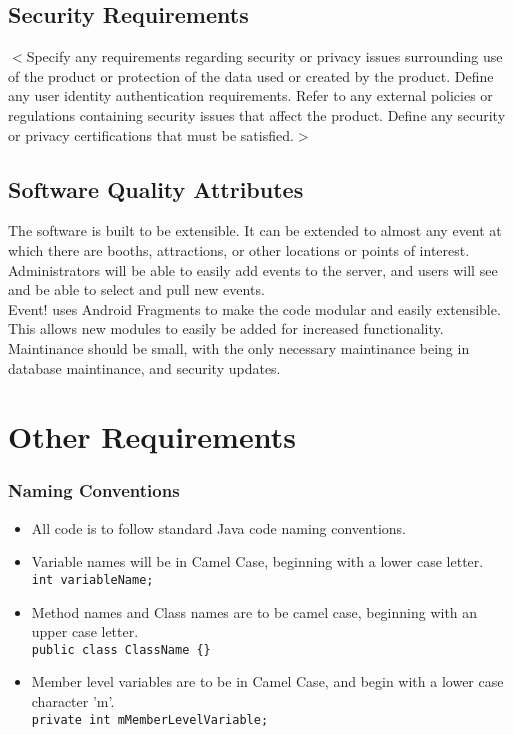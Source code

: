\documentclass{scrreprt}
\begin{document}
\section{Security Requirements}
$<$Specify any requirements regarding security or privacy issues surrounding use 
of the product or protection of the data used or created by the product. Define 
any user identity authentication requirements. Refer to any external policies or 
regulations containing security issues that affect the product. Define any 
security or privacy certifications that must be satisfied.$>$

\section{Software Quality Attributes}
The software is built to be extensible. It can be extended to almost any event at
which there are booths, attractions, or other locations or points of interest. \\ 
Administrators will be able to easily add events to the server, and users will see
and be able to select and pull new events. \\
Event! uses Android Fragments to make the code modular and easily extensible. 
This allows new modules to easily be added for increased functionality. \\
Maintinance should be small, with the only necessary maintinance being in 
database maintinance, and security updates. \\

\chapter{Other Requirements}


\subsection{Naming Conventions}
\begin{itemize}
\item All code is to follow standard Java code naming conventions.
\item Variable names will be in Camel Case, beginning with a lower case letter.\\
\texttt{int variableName;}
\item Method names and Class names are to be camel case, beginning with an upper case letter. \\
\texttt{public class ClassName \{\}}
\item Member level variables are to be in Camel Case, and begin with a lower case character 'm'. \\
\texttt{private int mMemberLevelVariable;}
\end{itemize}
\end{document}
